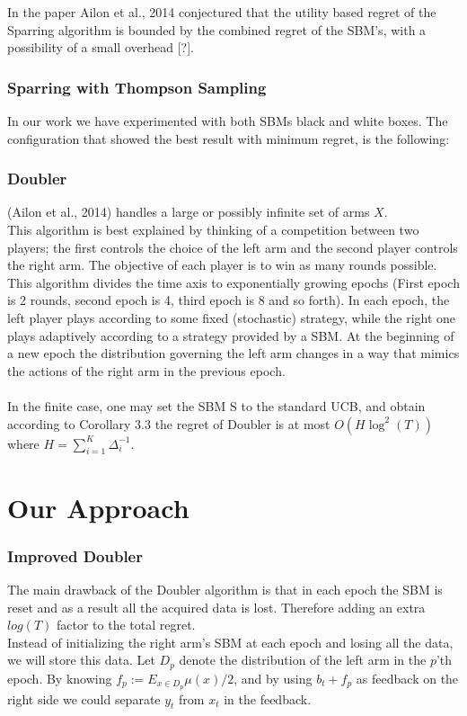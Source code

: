 \documentclass{llncs}
\begin{document}
		
	\begin{conjecture}
 		In the paper Ailon et al., 2014 conjectured that the utility based regret of the Sparring algorithm is bounded by the combined regret of the SBM's, with a possibility of a small overhead [?].
 	\end{conjecture}		
		
	\subsubsection{Sparring with Thompson Sampling}
		In our work  we have experimented with both SBMs black and white boxes. The configuration that showed the best result with minimum regret, is the following: 
		
		
	\subsubsection{Doubler}
(Ailon et al., 2014) handles a large or possibly infinite set of arms $X$. 
\\
This algorithm is best explained by thinking of a competition between
two players; the first controls the choice of the left arm and
the second player controls the right arm. The objective of each
player is to win as many rounds possible.
\\
This algorithm divides the time axis to exponentially growing epochs (First epoch is 2 rounds, second epoch is 4, third epoch is 8 and so forth).
In each epoch, the left player plays according to some fixed
(stochastic) strategy, while the right one plays adaptively according to a strategy provided by a SBM. At the beginning of a new epoch the distribution governing the left arm changes in a way that mimics the actions of the right arm in the previous epoch.\\
			
		\\
		In the finite case, one may set the SBM S to the standard
UCB, and obtain according to Corollary 3.3 the regret of Doubler is at most $O(H \log^2 (T))$ where $H=\sum_{i=1}^K \Delta^{-1}_i$.
\newpage

\section{Our Approach}	
		
	\subsubsection{Improved Doubler}
	The main drawback of the Doubler algorithm is that in each epoch the SBM is reset and as a result all the acquired data is lost. Therefore adding an extra $log(T)$ factor to the total regret.\\
	Instead of initializing the right arm’s SBM at each epoch and losing all the data, we will store this data.
Let $D_p$ denote the distribution of the left arm in the $p$’th epoch. 
By knowing $f_p := E_{x\in D_p} \mu(x)/2$, and by using $b_t + f_p$ as feedback on the right side we could separate $y_t$ from $x_t$ in the feedback.
\\
		
		
\end{document}
